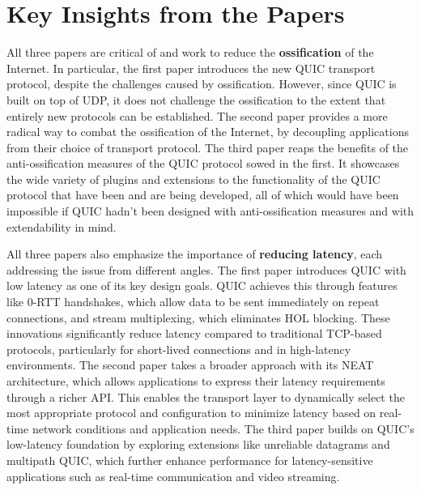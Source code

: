 \section{Key Insights from the Papers}%
\label{sec:Key Insights from the Papers}

All three papers are critical of and work to reduce the \textbf{ossification }of the Internet. In particular, the first paper \cite{langley2017quic} introduces the  new QUIC transport protocol, despite the challenges caused by ossification. However, since QUIC is built on top of UDP, it does not challenge the ossification to the extent that entirely new protocols can be established. The second paper \cite{grinnemo2016towards} provides a more radical way to combat the ossification of the Internet, by decoupling applications from their choice of transport protocol. The third paper \cite{kosek2021beyond} reaps the benefits of the anti-ossification measures of the QUIC protocol sowed in the first. It showcases the wide variety of plugins and extensions to the functionality of the QUIC protocol that have been and are being developed, all of which would have been impossible if QUIC hadn't been designed with anti-ossification measures and with extendability in mind. 

All three papers also emphasize the importance of \textbf{reducing latency}, each addressing the issue from different angles. The first paper \cite{langley2017quic} introduces QUIC with low latency as one of its key design goals. QUIC achieves this through features like 0-RTT handshakes, which allow data to be sent immediately on repeat connections, and stream multiplexing, which eliminates HOL blocking. These innovations significantly reduce latency compared to traditional TCP-based protocols, particularly for short-lived connections and in high-latency environments. The second paper \cite{grinnemo2016towards} takes a broader approach with its NEAT architecture, which allows applications to express their latency requirements through a richer API. This enables the transport layer to dynamically select the most appropriate protocol and configuration to minimize latency based on real-time network conditions and application needs. The third paper \cite{kosek2021beyond} builds on QUIC's low-latency foundation by exploring extensions like unreliable datagrams and multipath QUIC, which further enhance performance for latency-sensitive applications such as real-time communication and video streaming.